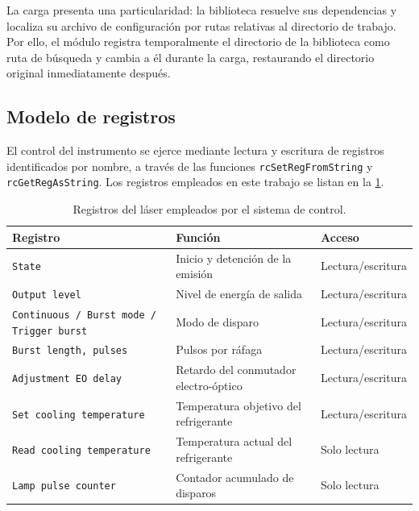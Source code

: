 La carga presenta una particularidad: la biblioteca resuelve sus
dependencias y localiza su archivo de configuración por rutas
relativas al directorio de trabajo. Por ello, el módulo registra
temporalmente el directorio de la biblioteca como ruta de búsqueda y
cambia a él durante la carga, restaurando el directorio original
inmediatamente después.

\subsection*{Modelo de registros}

El control del instrumento se ejerce mediante lectura y escritura de
registros identificados por nombre, a través de las funciones
\texttt{rcSetRegFromString} y \texttt{rcGetRegAsString}. Los
registros empleados en este trabajo se listan en la
\cref{tab:registros_laser}.

\begin{table}[H]
  \centering
  \caption{Registros del láser empleados por el sistema de control.}
  \label{tab:registros_laser}
  \begin{tabular}{lll}
    \toprule
    \textbf{Registro} & \textbf{Función} & \textbf{Acceso} \\
    \midrule
    \texttt{State}                  & Inicio y detención de la emisión & Lectura/escritura \\
    \texttt{Output level}           & Nivel de energía de salida       & Lectura/escritura \\
    \texttt{Continuous / Burst mode / Trigger burst}
                                    & Modo de disparo                  & Lectura/escritura \\
    \texttt{Burst length, pulses}   & Pulsos por ráfaga                & Lectura/escritura \\
    \texttt{Adjustment EO delay}    & Retardo del conmutador electro-óptico
                                                                       & Lectura/escritura \\
    \texttt{Set cooling temperature}& Temperatura objetivo del refrigerante
                                                                       & Lectura/escritura \\
    \texttt{Read cooling temperature}
                                    & Temperatura actual del refrigerante
                                                                       & Solo lectura \\
    \texttt{Lamp pulse counter}     & Contador acumulado de disparos   & Solo lectura \\
    \bottomrule
  \end{tabular}
\end{table}

